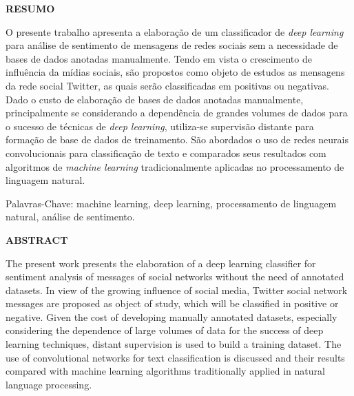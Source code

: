 \pagebreak

\begin{center}
\textbf{RESUMO}
\end{center}
\vspace{0.5cm}

O presente trabalho apresenta a elaboração de um classificador de \textit{deep learning} para análise de sentimento de
mensagens de redes sociais sem a necessidade de bases de dados anotadas manualmente.
Tendo em vista o crescimento de influência da mídias sociais, são propostos como objeto de estudos as mensagens da rede
social Twitter, as quais serão classificadas em positivas ou negativas.
Dado o custo de elaboração de bases de dados anotadas manualmente, principalmente se considerando a dependência de
grandes volumes de dados para o sucesso de técnicas de \textit{deep learning}, utiliza-se supervisão distante para
formação de base de dados de treinamento.
São abordados o uso de redes neurais convolucionais para classificação de texto e comparados seus resultados com
algoritmos de \textit{machine learning} tradicionalmente aplicadas no processamento de linguagem natural.

\vspace{0.5cm}

\noindent Palavras-Chave: machine learning, deep learning, processamento de linguagem natural, análise de sentimento.

\pagebreak

\begin{center}
\textbf{ABSTRACT}
\end{center}
\vspace{0.5cm}

The present work presents the elaboration of a deep learning classifier for sentiment analysis of messages of social
networks without the need of annotated datasets.
In view of the growing influence of social media, Twitter social network messages are proposed as object of study, which
will be classified in positive or negative.
Given the cost of developing manually annotated datasets, especially considering the dependence of large volumes
of data for the success of deep learning techniques, distant supervision is used to build a training dataset.
The use of convolutional networks for text classification is discussed and their results compared with machine learning
algorithms traditionally applied in natural language processing.

\vspace{0.5cm}

